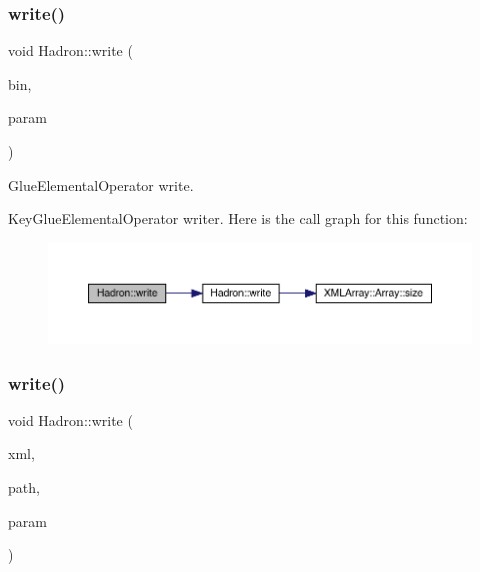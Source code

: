 \subsubsection{\texorpdfstring{write()}{write()}\hspace{0.1cm}{\footnotesize\ttfamily [46/95]}}
{\footnotesize\ttfamily void Hadron\+::write (\begin{DoxyParamCaption}\item[{\mbox{\hyperlink{classADATIO_1_1BinaryWriter}{Binary\+Writer}} \&}]{bin,  }\item[{const \mbox{\hyperlink{structHadron_1_1KeyGlueElementalOperator__t}{Key\+Glue\+Elemental\+Operator\+\_\+t}} \&}]{param }\end{DoxyParamCaption})}



Glue\+Elemental\+Operator write. 

Key\+Glue\+Elemental\+Operator writer. Here is the call graph for this function\+:\nopagebreak
\begin{figure}[H]
\begin{center}
\leavevmode
\includegraphics[width=350pt]{d1/daf/namespaceHadron_a91e2c5264aeab6dfb2be779cf7140626_cgraph}
\end{center}
\end{figure}
\mbox{\label{namespaceHadron_a2737e3c3e39c76c6dbe81ce5e484f6cc}} 
\subsubsection{\texorpdfstring{write()}{write()}\hspace{0.1cm}{\footnotesize\ttfamily [47/95]}}
{\footnotesize\ttfamily void Hadron\+::write (\begin{DoxyParamCaption}\item[{\mbox{\hyperlink{classADATXML_1_1XMLWriter}{X\+M\+L\+Writer}} \&}]{xml,  }\item[{const std\+::string \&}]{path,  }\item[{const \mbox{\hyperlink{structHadron_1_1HadronQuarkLocation__t}{Hadron\+Quark\+Location\+\_\+t}} \&}]{param }\end{DoxyParamCaption})}



